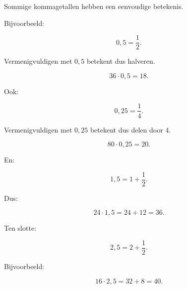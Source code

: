 \documentclass{ximera}
\begin{document}

Sommige kommagetallen hebben een eenvoudige betekenis.

Bijvoorbeeld:

\[
0{,}5=\frac{1}{2}.
\]

Vermenigvuldigen met \(0{,}5\) betekent dus halveren.

\[
36\cdot0{,}5=18.
\]

Ook:

\[
0{,}25=\frac{1}{4}.
\]

Vermenigvuldigen met \(0{,}25\) betekent dus delen door \(4\).

\[
80\cdot0{,}25=20.
\]

En:

\[
1{,}5=1+\frac{1}{2}.
\]

Dus:

\[
24\cdot1{,}5
=
24+12
=
36.
\]

Ten slotte:

\[
2{,}5=2+\frac{1}{2}.
\]

Bijvoorbeeld:

\[
16\cdot2{,}5
=
32+8
=
40.
\]
\end{document}

